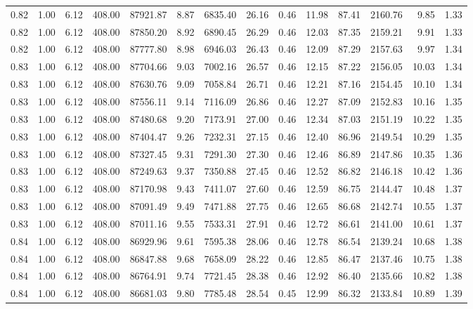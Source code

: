 \begin{table}[!ht]
\begin{tabular}{rrrrrrrrrrrrrr}
0.82 & 1.00 & 6.12 & 408.00 & 87921.87 & 8.87 & 6835.40 & 26.16 & 0.46 & 11.98 & 87.41 & 2160.76 & 9.85 & 1.33 \\
0.82 & 1.00 & 6.12 & 408.00 & 87850.20 & 8.92 & 6890.45 & 26.29 & 0.46 & 12.03 & 87.35 & 2159.21 & 9.91 & 1.33 \\
0.82 & 1.00 & 6.12 & 408.00 & 87777.80 & 8.98 & 6946.03 & 26.43 & 0.46 & 12.09 & 87.29 & 2157.63 & 9.97 & 1.34 \\
0.83 & 1.00 & 6.12 & 408.00 & 87704.66 & 9.03 & 7002.16 & 26.57 & 0.46 & 12.15 & 87.22 & 2156.05 & 10.03 & 1.34 \\
0.83 & 1.00 & 6.12 & 408.00 & 87630.76 & 9.09 & 7058.84 & 26.71 & 0.46 & 12.21 & 87.16 & 2154.45 & 10.10 & 1.34 \\
0.83 & 1.00 & 6.12 & 408.00 & 87556.11 & 9.14 & 7116.09 & 26.86 & 0.46 & 12.27 & 87.09 & 2152.83 & 10.16 & 1.35 \\
0.83 & 1.00 & 6.12 & 408.00 & 87480.68 & 9.20 & 7173.91 & 27.00 & 0.46 & 12.34 & 87.03 & 2151.19 & 10.22 & 1.35 \\
0.83 & 1.00 & 6.12 & 408.00 & 87404.47 & 9.26 & 7232.31 & 27.15 & 0.46 & 12.40 & 86.96 & 2149.54 & 10.29 & 1.35 \\
0.83 & 1.00 & 6.12 & 408.00 & 87327.45 & 9.31 & 7291.30 & 27.30 & 0.46 & 12.46 & 86.89 & 2147.86 & 10.35 & 1.36 \\
0.83 & 1.00 & 6.12 & 408.00 & 87249.63 & 9.37 & 7350.88 & 27.45 & 0.46 & 12.52 & 86.82 & 2146.18 & 10.42 & 1.36 \\
0.83 & 1.00 & 6.12 & 408.00 & 87170.98 & 9.43 & 7411.07 & 27.60 & 0.46 & 12.59 & 86.75 & 2144.47 & 10.48 & 1.37 \\
0.83 & 1.00 & 6.12 & 408.00 & 87091.49 & 9.49 & 7471.88 & 27.75 & 0.46 & 12.65 & 86.68 & 2142.74 & 10.55 & 1.37 \\
0.83 & 1.00 & 6.12 & 408.00 & 87011.16 & 9.55 & 7533.31 & 27.91 & 0.46 & 12.72 & 86.61 & 2141.00 & 10.61 & 1.37 \\
0.84 & 1.00 & 6.12 & 408.00 & 86929.96 & 9.61 & 7595.38 & 28.06 & 0.46 & 12.78 & 86.54 & 2139.24 & 10.68 & 1.38 \\
0.84 & 1.00 & 6.12 & 408.00 & 86847.88 & 9.68 & 7658.09 & 28.22 & 0.46 & 12.85 & 86.47 & 2137.46 & 10.75 & 1.38 \\
0.84 & 1.00 & 6.12 & 408.00 & 86764.91 & 9.74 & 7721.45 & 28.38 & 0.46 & 12.92 & 86.40 & 2135.66 & 10.82 & 1.38 \\
0.84 & 1.00 & 6.12 & 408.00 & 86681.03 & 9.80 & 7785.48 & 28.54 & 0.45 & 12.99 & 86.32 & 2133.84 & 10.89 & 1.39 \\

\end{tabular}
\end{table}
